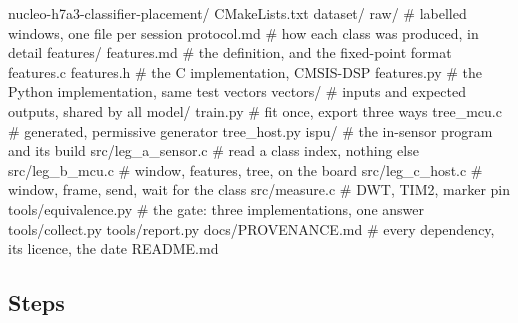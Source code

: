 \begin{plaincode}
nucleo-h7a3-classifier-placement/
  CMakeLists.txt
  dataset/
    raw/                        # labelled windows, one file per session
    protocol.md                 # how each class was produced, in detail
  features/
    features.md                 # the definition, and the fixed-point format
    features.c  features.h      # the C implementation, CMSIS-DSP
    features.py                 # the Python implementation, same test vectors
    vectors/                    # inputs and expected outputs, shared by all
  model/
    train.py                    # fit once, export three ways
    tree_mcu.c                  # generated, permissive generator
    tree_host.py
    ispu/                       # the in-sensor program and its build
  src/leg_a_sensor.c            # read a class index, nothing else
  src/leg_b_mcu.c               # window, features, tree, on the board
  src/leg_c_host.c              # window, frame, send, wait for the class
  src/measure.c                 # DWT, TIM2, marker pin
  tools/equivalence.py          # the gate: three implementations, one answer
  tools/collect.py  tools/report.py
  docs/PROVENANCE.md            # every dependency, its licence, the date
  README.md
\end{plaincode}

\subsection*{Steps}

